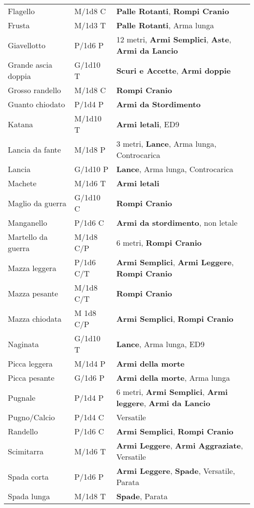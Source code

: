 \documentclass[landscape,10pt,a4paper]{article}
\begin{document}
\begin{multicols}{2}
\begin{dmbox}[title=Armi - pagina \pageref{equipaggiamentoarmi}]
{\begin{tabularx}{1\linewidth}{lll}
Flagello& M/1d8 C& \textbf{Palle Rotanti}, \textbf{Rompi Cranio}\\
Frusta& M/1d3 T& \textbf{Palle Rotanti}, Arma lunga\\
Giavellotto& P/1d6 P& 12 metri, \textbf{Armi Semplici}, \textbf{Aste}, \textbf{Armi da Lancio}\\
Grande ascia doppia& G/1d10 T& \textbf{Scuri e Accette}, \textbf{Armi doppie}\\
Grosso randello& M/1d8 C&\textbf{Rompi Cranio}\\
Guanto chiodato& P/1d4 P&\textbf{Armi da Stordimento}\\
Katana& M/1d10 T& \textbf{Armi letali}, ED9\\
Lancia da fante& M/1d8 P&3 metri, \textbf{Lance}, Arma lunga, Controcarica\\
Lancia& G/1d10 P&\textbf{Lance}, Arma lunga, Controcarica\\
Machete& M/1d6 T&\textbf{Armi letali}\\
Maglio da guerra& G/1d10 C& \textbf{Rompi Cranio}\\
Manganello& P/1d6 C& \textbf{Armi da stordimento}, non letale\\
Martello da guerra& M/1d8 C/P& 6 metri, \textbf{Rompi Cranio}\\
Mazza leggera& P/1d6 C/T& \textbf{Armi Semplici}, \textbf{Armi Leggere}, \textbf{Rompi Cranio} \\
Mazza pesante& M/1d8 C/T& \textbf{Rompi Cranio}\\
Mazza chiodata& M 1d8 C/P& \textbf{Armi Semplici}, \textbf{Rompi Cranio}\\
Naginata& G/1d10 T&\textbf{Lance}, Arma lunga, ED9\\
Picca leggera& M/1d4 P&\textbf{Armi della morte}\\
Picca pesante& G/1d6 P&\textbf{Armi della morte}, Arma lunga\\
Pugnale& P/1d4 P& 6 metri, \textbf{Armi Semplici}, \textbf{Armi leggere}, \textbf{Armi da Lancio}\\
Pugno/Calcio & P/1d4 C&Versatile\\
Randello& P/1d6 C& \textbf{Armi Semplici}, \textbf{Rompi Cranio}\\
Scimitarra& M/1d6 T&\textbf{Armi Leggere}, \textbf{Armi Aggraziate}, Versatile\\
Spada corta& P/1d6 P&\textbf{Armi Leggere}, \textbf{Spade}, Versatile, Parata\\
Spada lunga& M/1d8 T&\textbf{Spade}, Parata\\

\end{tabularx}}
\end{dmbox}
\end{multicols}
\end{document}
